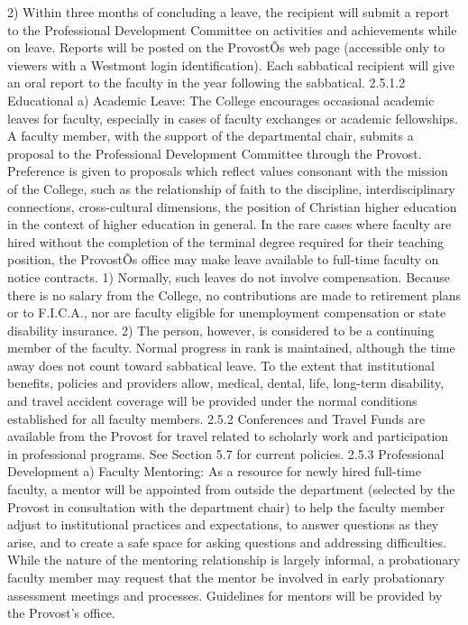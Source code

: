 \documentclass[letterpaper, 11pt]{article}
\begin{document}
2) Within three months of concluding a leave, the recipient will submit a report to the Professional Development Committee on activities and achievements while on leave.  Reports will be posted on the ProvostÕs web page (accessible only to viewers with a Westmont login identification).  Each sabbatical recipient will give an oral report to the faculty in the year following the sabbatical.  
2.5.1.2 Educational
a) Academic Leave:  The College encourages occasional academic leaves for faculty, especially in cases of faculty exchanges or academic fellowships.  A faculty member, with the support of the departmental chair, submits a proposal to the Professional Development Committee through the Provost.  Preference is given to proposals which reflect values consonant with the mission of the College, such as the relationship of faith to the discipline, interdisciplinary connections, cross-cultural dimensions, the position of Christian higher education in the context of higher education in general.  In the rare cases where faculty are hired without the completion of the terminal degree required for their teaching position, the ProvostÕs office may make leave available to full-time faculty on notice contracts.
1) Normally, such leaves do not involve compensation.  Because there is no salary from the College, no contributions are made to retirement plans or to F.I.C.A., nor are faculty eligible for unemployment compensation or state disability insurance.
2) The person, however, is considered to be a continuing member of the faculty. Normal progress in rank is maintained, although the time away does not count toward sabbatical leave.  To the extent that institutional benefits, policies and providers allow, medical, dental, life, long-term disability, and travel accident coverage will be provided under the normal conditions established for all faculty members. 
2.5.2 Conferences and Travel
   Funds are available from the Provost for travel related to scholarly work and participation in professional programs.  See Section 5.7 for current policies.
2.5.3 Professional Development
a) Faculty Mentoring:  As a resource for newly hired full-time faculty, a mentor will be appointed from outside the department (selected by the Provost in consultation with the department chair) to help the faculty member adjust to institutional practices and expectations, to answer questions as they arise, and to create a safe space for asking questions and addressing difficulties.  While the nature of the mentoring relationship is largely informal, a probationary faculty member may request that the mentor be involved in early probationary assessment meetings and processes.  Guidelines for mentors will be provided by the Provost's office.
\end{document}
